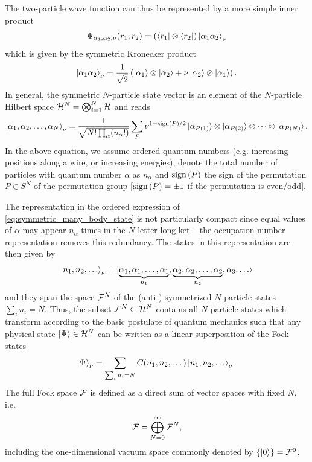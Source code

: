The two-particle wave function can thus be represented by a more simple inner product
\begin{align}
    \Psi_{\alpha_1,\alpha_2,\nu}(r_1,r_2) = \left(\bra{r_1}\otimes\bra{r_2}\right)\ket{\alpha_1 \alpha_2}_\nu
\end{align}
which is given by the symmetric Kronecker product
\begin{align}
    \ket{\alpha_1 \alpha_2}_\nu = \frac1{\sqrt2}\left(\ket{\alpha_1}\otimes\ket{\alpha_2} + \nu\ket{\alpha_2}\otimes\ket{\alpha_1}\right).
\end{align}
In general, the symmetric $N$-particle state vector is an element of the $N$-particle Hilbert space $\mathcal{H}^N = \bigotimes_{i=1}^N\mathcal{H}$ and reads
\begin{align}
    \ket{\alpha_1,\alpha_2,\dots,\alpha_N}_\nu = \frac1{\sqrt{N!\prod_{\alpha}(n_\alpha!)}}\sum_P \nu^{1-\text{sign}\left( P \right)/2}\ket{\alpha_{P(1)}}\otimes\ket{\alpha_{P(2)}}\otimes\dots\otimes\ket{\alpha_{P(N)}}.
    \label{eq:symmetric_many_body_state}
\end{align}
In the above equation, we assume ordered quantum numbers (e.g. increasing positions along a wire, or increasing energies), denote the total number of particles with quantum number $\alpha$ as $n_\alpha$ and $\text{sign}\left( P \right)$ the sign of the permutation $P\in S^N$ of the permutation group [$\text{sign}\left( P \right)=\pm1$ if the permutation is even/odd].

The representation in the ordered expression of \cref{eq:symmetric_many_body_state} is not particularly compact since equal values of $\alpha$ may appear $n_\alpha$ times in the $N$-letter long ket -- the occupation number representation removes this redundancy.
The states in this representation are then given by
\begin{align}
    \ket{n_1, n_2, \dots}_\nu = \ket{\underbrace{\alpha_1,\alpha_1,\dots,\alpha_1}_{n_1}, \underbrace{\alpha_2, \alpha_2,\dots, \alpha_2}_{n_2}, \alpha_3, \dots}
\end{align}
and they span the space $\mathcal{F}^N$ of the (anti-) symmetrized $N$-particle states $\sum_{i} n_i = N$.
Thus, the subset $\mathcal{F}^N\subset \mathcal{H}^N$ contains all $N$-particle states which transform according to the basic postulate of quantum mechanics such that any physical state $\ket{\Psi}\in\mathcal{H}^N$ can be written as a linear superposition of the Fock states
\begin{align}
    \ket{\Psi}_\nu = \sum_{\sum_i n_i = N}C(n_1,n_2,\dots)\ket{n_1,n_2,\dots}_\nu.
\end{align}
The full Fock space $\mathcal{F}$ is defined as a direct sum of vector spaces with fixed $N$, i.e.
\begin{align}
    \mathcal{F} = \bigoplus_{N=0}^\infty \mathcal{F}^N,
\end{align}
including the one-dimensional vacuum space commonly denoted by $\{\ket{0}\}=\mathcal{F}^0$.

